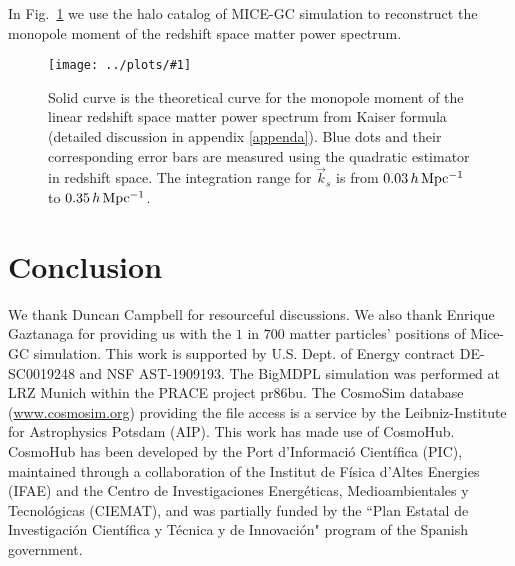 \documentclass[prd,amsmath,amssymb,floatfix,superscriptaddress,nofootinbib,twocolumn]{revtex4-1}
\newcommand{\vk}{\vec{k}}
\newcommand{\rf}[1]{\ref{fig:#1}}
\newcommand{\sfig}[2]{
\texttt{[image: ../plots/\#1]}
        }
\newcommand{\Sfig}[2]{
   \begin{figure}[thbp]
   \begin{center}
    \sfig{../plots/#1.pdf}{\columnwidth}
    \caption{{\small #2}}
    \label{fig:#1}
     \end{center}
   \end{figure}
}
\begin{document}
In Fig.~\rf{SN_RS} we use the halo catalog of MICE-GC simulation to reconstruct the monopole moment of the redshift space matter power spectrum.

\Sfig{SN_RS}{Solid curve is the theoretical curve for the monopole moment of the linear redshift space matter power spectrum from Kaiser formula (detailed discussion in appendix \ref{appenda}). Blue dots and their corresponding error bars are measured using the quadratic estimator in redshift space. The integration range for $\vk_s$ is from $0.03 \,h \,\rm Mpc^{-1}$ to $0.35\,h\,\rm Mpc^{-1}$.}

\section{Conclusion} \label{sec8}

\acknowledgements
We thank Duncan Campbell for resourceful discussions. We also thank Enrique Gaztanaga for providing us with the $1$ in $700$ matter particles' positions of Mice-GC simulation. This work is supported by U.S. Dept. of Energy contract DE-SC0019248 and NSF AST-1909193.
The BigMDPL simulation was performed at LRZ Munich within the PRACE project pr86bu. The CosmoSim database (\url{www.cosmosim.org}) providing the file access is a service by the Leibniz-Institute for Astrophysics Potsdam (AIP).
This work has made use of CosmoHub. CosmoHub has been developed by the Port d'Informació Científica (PIC), maintained through a collaboration of the Institut de Física d'Altes Energies (IFAE) and the Centro de Investigaciones Energéticas, Medioambientales y Tecnológicas (CIEMAT), and was partially funded by the ``Plan Estatal de Investigación Científica y Técnica y de Innovación" program of the Spanish government.
\clearpage

\appendix 
\end{document}
